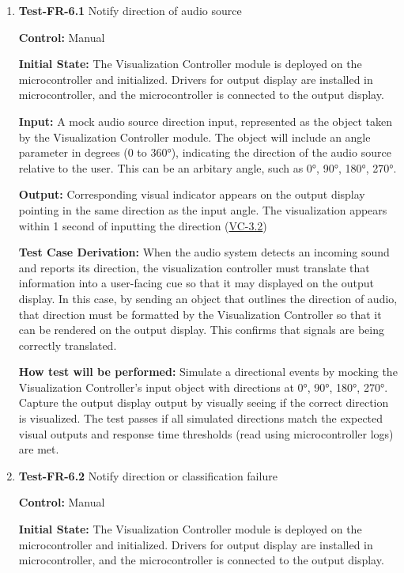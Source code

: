 \documentclass[12pt, titlepage]{article}
\begin{document}
\begin{enumerate}

\item{\textbf{Test-FR-6.1} Notify direction of audio source \\}

\textbf{Control:} Manual
					
\textbf{Initial State:} 
The Visualization Controller module is deployed on the microcontroller and 
initialized. Drivers for output display are installed in microcontroller, 
and the microcontroller is connected to the output display. 
					
\textbf{Input:}
A mock audio source direction input, represented as the object taken by the 
Visualization Controller module. The object will include an angle parameter in 
degrees (0 to 360°), indicating the direction of the audio source relative to 
the user. This can be an arbitary angle, such as 0°, 90°, 180°, 270°. 
					
\textbf{Output:}
Corresponding visual indicator appears on the output display pointing in 
the same direction as the input angle. The visualization 
appears within 1 second of inputting the direction 
(\hyperref[SRS-sec:VC-3.2]{VC-3.2}) 

\textbf{Test Case Derivation:} 
When the audio system detects an incoming sound and reports its direction, 
the visualization controller must translate that information into a user-facing 
cue so that it may displayed on the output display. In this case, by sending an 
object that outlines the direction of audio, that direction must be formatted 
by the Visualization Controller so that it can be rendered on the output display.
 This confirms that signals are being correctly translated.
					
\textbf{How test will be performed:}
Simulate a directional events by mocking the Visualization Controller's input 
object with directions at 0°, 90°, 180°, 270°. Capture the output display 
output by visually seeing if the correct direction is visualized. The test 
passes if all simulated directions match the expected visual outputs and 
response time thresholds (read using microcontroller logs) are met. 
					
\item{\textbf{Test-FR-6.2} Notify direction or classification failure\\}

\textbf{Control:} Manual
					
\textbf{Initial State:}
The Visualization Controller module is deployed on the microcontroller and 
initialized. Drivers for output display are installed in microcontroller, 
and the microcontroller is connected to the output display. 
					

\end{enumerate}
\end{document}
